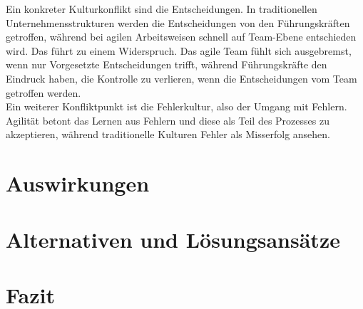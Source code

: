 \documentclass[ngerman]{seminarvorlage}
\begin{document}
Ein konkreter Kulturkonflikt sind die Entscheidungen. In traditionellen Unternehmensstrukturen werden die Entscheidungen von den Führungskräften getroffen, während bei agilen Arbeitsweisen schnell auf Team-Ebene entschieden wird. Das führt zu einem Widerspruch. Das agile Team fühlt sich ausgebremst, wenn nur Vorgesetzte Entscheidungen trifft, während Führungskräfte den Eindruck haben, die Kontrolle zu verlieren, wenn die Entscheidungen vom Team getroffen werden.\\
Ein weiterer Konfliktpunkt ist die Fehlerkultur, also der Umgang mit Fehlern. Agilität betont das Lernen aus Fehlern und diese als Teil des Prozesses zu akzeptieren, während traditionelle Kulturen Fehler als Misserfolg ansehen.



\section{Auswirkungen}

\section{Alternativen und Lösungsansätze}

\section{Fazit}


%
%


\end{document}
